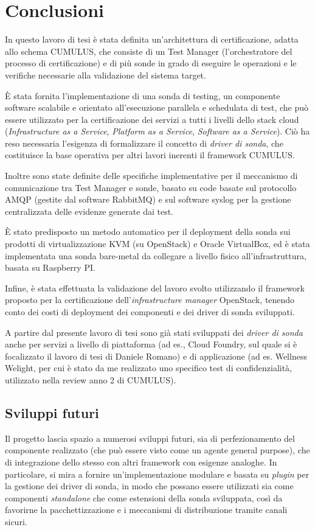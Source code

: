 \documentclass[../main.tex]{subfiles}
\begin{document}
\chapter*{Conclusioni}

In questo lavoro di tesi è stata definita un'architettura di certificazione, adatta allo schema CUMULUS, che consiste di un Test Manager (l'orchestratore del processo di certificazione) e di più sonde in grado di eseguire le operazioni e le verifiche necessarie alla validazione del sistema target.

\`E stata fornita l'implementazione di una sonda di testing, un componente software scalabile e orientato all'esecuzione parallela e schedulata di test, che può essere utilizzato per la certificazione dei servizi a tutti i livelli dello stack cloud (\textit{Infrastructure as a Service}, \textit{Platform as a Service}, \textit{Software as a Service}).
Ciò ha reso necessaria l'esigenza di formalizzare il concetto di \textit{driver di sonda}, che costituisce la base operativa per altri lavori inerenti il framework CUMULUS.

Inoltre sono state definite delle specifiche implementative per il meccanismo di comunicazione tra Test Manager e sonde, basato su code basate sul protocollo AMQP (gestite dal software RabbitMQ) e sul software syslog per la gestione centralizzata delle evidenze generate dai test.

\`E stato predisposto un metodo automatico per il deployment della sonda sui prodotti di virtualizzazione KVM (su OpenStack) e Oracle VirtualBox, ed è stata implementata una sonda bare-metal da collegare a livello fisico all'infrastruttura, basata su Raspberry PI.

Infine, è stata effettuata la validazione del lavoro svolto utilizzando il framework proposto per la certificazione dell'\textit{infrastructure manager}  OpenStack, tenendo conto dei costi di deployment dei componenti e dei driver di sonda sviluppati.

A partire dal presente lavoro di tesi sono già stati sviluppati dei \textit{driver di sonda} anche per servizi a livello di piattaforma (ad es., Cloud Foundry, sul quale si è focalizzato il lavoro di tesi di Daniele Romano) e di applicazione (ad es. Wellness Welight, per cui è stato da me realizzato uno specifico test di confidenzialità, utilizzato nella review anno 2 di CUMULUS).

\section{Sviluppi futuri}
Il progetto lascia spazio a numerosi sviluppi futuri, sia di perfezionamento del componente realizzato (che può essere visto come un agente general purpose), che di integrazione dello stesso con altri framework con esigenze analoghe.
In particolare, si mira a fornire un'implementazione modulare e basata su \textit{plugin} per la gestione dei driver di sonda, in modo che possano essere utilizzati sia come componenti \textit{standalone} che come estensioni della sonda sviluppata, così da favorirne la pacchettizzazione e i meccanismi di distribuzione tramite canali sicuri.
\end{document}
